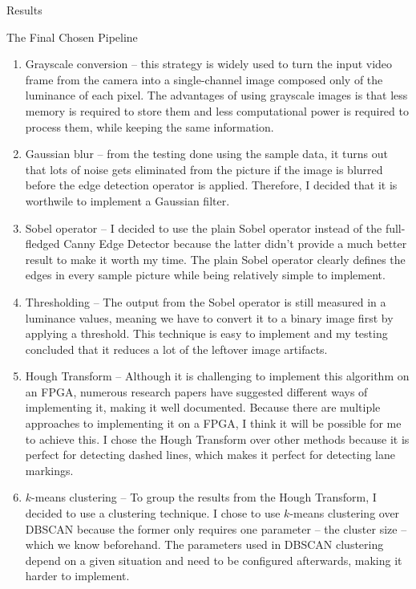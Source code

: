 \documentclass{matthijs}
\begin{document}
\begin{hoofdstuk}{Results}
\begin{paragraaf}{The Final Chosen Pipeline}
			\begin{enumerate}

				\item	Grayscale conversion -- this strategy is widely used to turn the input video frame from the camera into a single-channel image composed only of the luminance of each pixel.
					The advantages of using grayscale images is that less memory is required to store them and less computational power is required to process them, while keeping the same information.
				\item	Gaussian blur -- from the testing done using the sample data, it turns out that lots of noise gets eliminated from the picture if the image is blurred before the edge detection operator is applied.
					Therefore, I decided that it is worthwile to implement a Gaussian filter.
				\item	Sobel operator -- I decided to use the plain Sobel operator instead of the full-fledged Canny Edge Detector because the latter didn't provide a much better result to make it worth my time.
					The plain Sobel operator clearly defines the edges in every sample picture while being relatively simple to implement.
				\item	Thresholding -- The output from the Sobel operator is still measured in a luminance values, meaning we have to convert it to a binary image first by applying a threshold.
					This technique is easy to implement and my testing concluded that it reduces a lot of the leftover image artifacts.
				\item	Hough Transform -- Although it is challenging to implement this algorithm on an FPGA, numerous research papers have suggested different ways of implementing it, making it well documented.
					Because there are multiple approaches to implementing it on a FPGA, I think it will be possible for me to achieve this.
					I chose the Hough Transform over other methods because it is perfect for detecting dashed lines, which makes it perfect for detecting lane markings.
				\item	$k$-means clustering -- To group the results from the Hough Transform, I decided to use a clustering technique.
					I chose to use $k$-means clustering over DBSCAN because the former only requires one parameter -- the cluster size -- which we know beforehand.
					The parameters used in DBSCAN clustering depend on a given situation and need to be configured afterwards, making it harder to implement.

			\end{enumerate}

		\end{paragraaf}

	\end{hoofdstuk}
\end{document}
